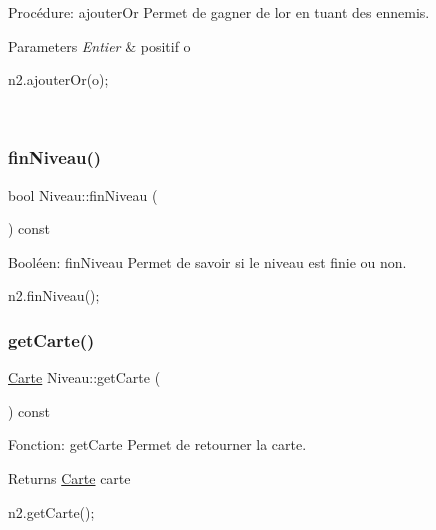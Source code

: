 Procédure\+: ajouter\+Or Permet de gagner de l\textquotesingle{}or en tuant des ennemis. 


\begin{DoxyParams}{Parameters}
{\em Entier} & positif o 
\begin{DoxyCode}
n2.ajouterOr(o);
\end{DoxyCode}
 \\
\hline
\end{DoxyParams}
\mbox{\label{classNiveau_aa94199eb0d75ab0d17c05272667e07a3}} 
\subsubsection{\texorpdfstring{fin\+Niveau()}{finNiveau()}}
{\footnotesize\ttfamily bool Niveau\+::fin\+Niveau (\begin{DoxyParamCaption}{ }\end{DoxyParamCaption}) const}



Booléen\+: fin\+Niveau Permet de savoir si le niveau est finie ou non. 


\begin{DoxyCode}
n2.finNiveau();
\end{DoxyCode}
 \mbox{\label{classNiveau_aa73cc05c792c580821b06e21e8eab4b1}} 
\subsubsection{\texorpdfstring{get\+Carte()}{getCarte()}}
{\footnotesize\ttfamily \hyperlink{classCarte}{Carte} Niveau\+::get\+Carte (\begin{DoxyParamCaption}{ }\end{DoxyParamCaption}) const}



Fonction\+: get\+Carte Permet de retourner la carte. 

\begin{DoxyReturn}{Returns}
\hyperlink{classCarte}{Carte} carte 
\begin{DoxyCode}
n2.getCarte();
\end{DoxyCode}
 
\end{DoxyReturn}
\mbox{\label{classNiveau_a2ec4d0acee314e00c509b603c580b13b}} 
